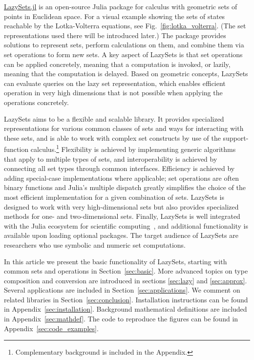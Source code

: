 \href{https://github.com/JuliaReach/LazySets.jl}{LazySets.jl} is an open-source Julia package for calculus with geometric sets of points in Euclidean space. For a visual example showing the sets of states reachable by the Lotka-Volterra equations, see Fig.~\ref{fig:lotka_volterra}.
(The set representations used there will be introduced later.)
%
The package provides solutions to represent sets, perform calculations on them, and combine them via set operations to form new sets.
%
A key aspect of LazySets is that set operations can be applied concretely, meaning that a computation is invoked, or lazily, meaning that the computation is delayed.
%
Based on geometric concepts, LazySets can evaluate queries on the lazy set representation, which enables efficient operation in very high dimensions that is not possible when applying the operations concretely.

\smallskip

LazySets aims to be a flexible and scalable library.
%
It provides specialized representations for various common classes of sets and ways for interacting with these sets, and is able to work with complex set constructs by use of the support-function calculus.\footnote{Complementary background is included in the Appendix.}
%
Flexibility is achieved by implementing generic algorithms that apply to multiple types of sets, and interoperability is achieved by connecting all set types through common interfaces.
%
Efficiency is achieved by adding special-case implementations where applicable; set operations are often binary functions and Julia's multiple dispatch greatly simplifies the choice of the most efficient implementation for a given combination of sets.
%
LazySets is designed to work with very high-dimensional sets but also provides specialized methods for one- and two-dimensional sets.
%
Finally, LazySets is well integrated with the Julia ecosystem for scientific computing~\cite{bezanson2017julia}, and additional functionality is available upon loading optional packages.
%
The target audience of LazySets are researchers who use symbolic and numeric set computations.

\smallskip

In this article we present the basic functionality of LazySets, starting with common sets and operations in Section~\ref{sec:basic}.
%
More advanced topics on type composition and conversion are introduced in sections \ref{sec:lazy} and \ref{sec:approx}.
%
Several applications are included in Section~\ref{sec:applications}.
%
We comment on related libraries in Section~\ref{sec:conclusion}.
%
Installation instructions can be found in Appendix~\ref{sec:installation}.
%
Background mathematical definitions are included in Appendix~\ref{sec:mathdef}.
%
The code to reproduce the figures can be found in Appendix~\ref{sec:code_examples}.

